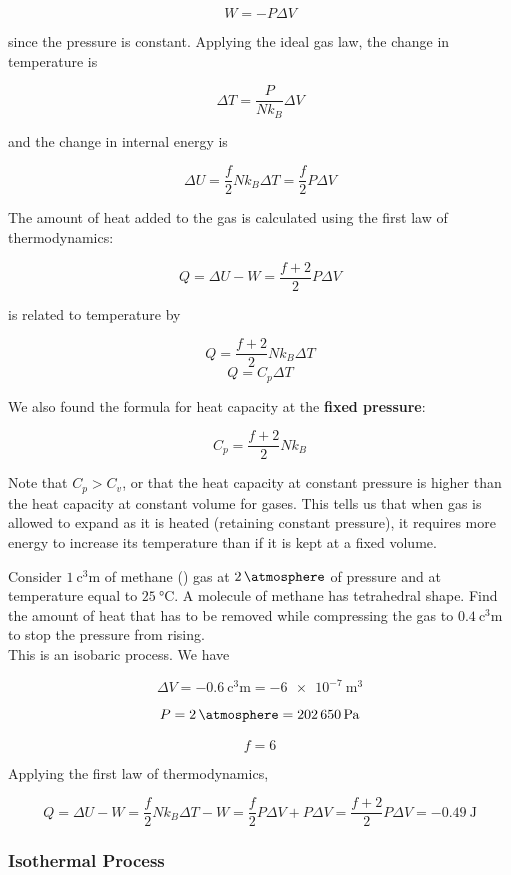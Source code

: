 \documentclass[12pt, a4paper]{article}
\newcounter{exa}
\begin{document}
$$W=-P\Delta V$$

since the pressure is constant. Applying the ideal gas law, the change in temperature is

$$\Delta T = \frac{P}{Nk_B}\Delta V$$

and the change in internal energy is

$$\Delta U = \frac{f}{2}Nk_B\Delta T=\frac{f}{2}P\Delta V$$

The amount of heat added to the gas is calculated using the first law of thermodynamics:

$$Q=\Delta U-W=\frac{f+2}{2} P\Delta V$$

is related to temperature by

$$Q=\frac{f+2}{2} Nk_B\Delta T$$
$$Q=C_p\Delta T$$

We also found the formula for heat capacity at the \textbf{fixed pressure}:

$$C_p=\frac{f+2}{2} Nk_B$$

Note that $C_p > C_v$, or that the heat capacity at constant pressure is higher than the heat capacity at constant volume for gases. This tells us that when gas is allowed to expand as it is heated (retaining constant pressure), it requires more energy to increase its temperature than if it is kept at a fixed volume.

\begin{texample}
Consider $\SI{1}{\cubic\centi\meter}$ of methane () gas at $\SI{2}{\atmosphere}$ of pressure and at temperature equal to $\SI{25}{\celsius}$. A molecule of methane has tetrahedral shape. Find the amount of heat that has to be removed while compressing the gas to $\SI{0.4}{\cubic\centi\meter}$ to stop the pressure from rising. \\

This is an isobaric process. We have

$$\Delta V=\SI{-0.6}{\cubic\centi\meter}=\SI{-6e-7}{\cubic\meter}$$

$$P=\SI{2}{\atmosphere}=\SI{202650}{\pascal}$$

$$f=6$$

Applying the first law of thermodynamics,

$$Q=\Delta U - W=\frac{f}{2}Nk_B\Delta T - W=\frac{f}{2}P\Delta V+P\Delta V=\frac{f+2}{2}P\Delta V=\SI{-0.49}{\joule}$$
\end{texample}

\subsubsection{Isothermal Process}
\end{document}
